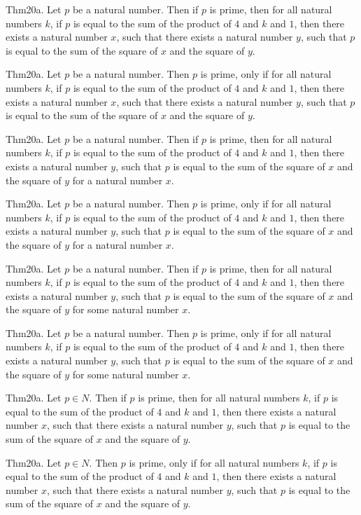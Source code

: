 \documentclass{article}
\begin{document}
Thm20a. Let $p$ be a natural number. Then if $p$ is prime, then for all natural numbers $k$, if $p$ is equal to the sum of the product of $4$ and $k$ and $1$, then there exists a natural number $x$, such that there exists a natural number $y$, such that $p$ is equal to the sum of the square of $x$ and the square of $y$.

Thm20a. Let $p$ be a natural number. Then $p$ is prime, only if for all natural numbers $k$, if $p$ is equal to the sum of the product of $4$ and $k$ and $1$, then there exists a natural number $x$, such that there exists a natural number $y$, such that $p$ is equal to the sum of the square of $x$ and the square of $y$.

Thm20a. Let $p$ be a natural number. Then if $p$ is prime, then for all natural numbers $k$, if $p$ is equal to the sum of the product of $4$ and $k$ and $1$, then there exists a natural number $y$, such that $p$ is equal to the sum of the square of $x$ and the square of $y$ for a natural number $x$.

Thm20a. Let $p$ be a natural number. Then $p$ is prime, only if for all natural numbers $k$, if $p$ is equal to the sum of the product of $4$ and $k$ and $1$, then there exists a natural number $y$, such that $p$ is equal to the sum of the square of $x$ and the square of $y$ for a natural number $x$.

Thm20a. Let $p$ be a natural number. Then if $p$ is prime, then for all natural numbers $k$, if $p$ is equal to the sum of the product of $4$ and $k$ and $1$, then there exists a natural number $y$, such that $p$ is equal to the sum of the square of $x$ and the square of $y$ for some natural number $x$.

Thm20a. Let $p$ be a natural number. Then $p$ is prime, only if for all natural numbers $k$, if $p$ is equal to the sum of the product of $4$ and $k$ and $1$, then there exists a natural number $y$, such that $p$ is equal to the sum of the square of $x$ and the square of $y$ for some natural number $x$.

Thm20a. Let $p \in N$. Then if $p$ is prime, then for all natural numbers $k$, if $p$ is equal to the sum of the product of $4$ and $k$ and $1$, then there exists a natural number $x$, such that there exists a natural number $y$, such that $p$ is equal to the sum of the square of $x$ and the square of $y$.

Thm20a. Let $p \in N$. Then $p$ is prime, only if for all natural numbers $k$, if $p$ is equal to the sum of the product of $4$ and $k$ and $1$, then there exists a natural number $x$, such that there exists a natural number $y$, such that $p$ is equal to the sum of the square of $x$ and the square of $y$.
\end{document}
